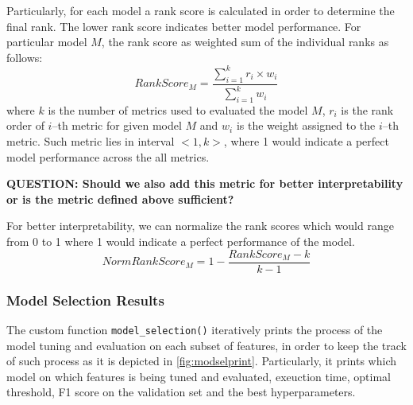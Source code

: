 Particularly, for each model a rank score is calculated in order to determine the final rank. The lower rank score indicates better model performance. For particular model $M$, the rank score as weighted sum of the individual ranks as follows:
\begin{equation}\label{eq:rankscorem}
    RankScore_{M} = \frac{\sum_{i=1}^{k} {r_i \times w_i}}{\sum_{i=1}^{k} {w_i}} 
\end{equation}
where $k$ is the number of metrics used to evaluated the model $M$, $r_i$ is the rank order of $i$--th metric for given model $M$ and $w_i$ is the weight assigned to the $i$--th metric.
Such metric lies in interval $<1, k>$, where 1 would indicate a perfect model performance across the all metrics.

\textbf{QUESTION: Should we also add this metric for better interpretability or is the metric defined above sufficient?}

For better interpretability, we can normalize the rank scores which would range from 0 to 1 where 1 would indicate a perfect performance of the model.
\begin{equation}\label{eq}
    NormRankScore_{M} = 1 - \frac{RankScore_{M} - k}{k - 1}
\end{equation}

\subsubsection{Model Selection Results}



The custom function \lstinline{model_selection()} iteratively prints the process of the model tuning and evaluation on each subset of features, in order to keep the track of such process as it is depicted in \autoref{fig:modselprint}.
Particularly, it prints which model on which features is being tuned and evaluated, exeuction time, optimal threshold, F1 score on the validation set and the best hyperparameters.


